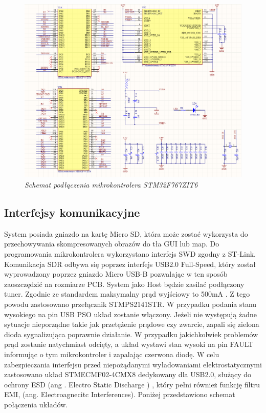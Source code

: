 \documentclass[eng,printmode]{mgr}
\begin{document}
\begin{figure}[!h]
    \centering
    \includegraphics[height=\textwidth, angle=90]{schematics/uC.png}
    \caption{\textit{Schemat podłączenia mikrokontrolera STM32F767ZIT6}}
\end{figure}

\subsection*{Interfejsy komunikacyjne}
System posiada gniazdo na kartę Micro SD, która może zostać wykorzysta do przechowywania skompresowanych obrazów do tła GUI lub map. Do programowania mikrokontrolera wykorzystano interfejs SWD zgodny z ST-Link. Komunikacja SDR odbywa się poprzez interfejs USB2.0 Full-Speed, który został wyprowadzony poprzez gniazdo Micro USB-B pozwalając w ten sposób zaoszczędzić na rozmiarze PCB. System jako Host będzie zasilać podłączony tuner. Zgodnie ze standardem maksymalny prąd wyjściowy to 500mA \cite{usbSpec}. Z tego powodu zastosowano przełącznik STMPS2141STR. W przypadku podania stanu wysokiego na pin USB PSO układ zostanie włączony. Jeżeli nie występują żadne sytuacje nieporządne takie jak przetężenie prądowe czy zwarcie, zapali się zielona dioda sygnalizująca poprawnie działanie. W przypadku jakichkolwiek problemów prąd zostanie natychmiast odcięty, a układ wystawi stan wysoki na pin FAULT informując o tym mikrokontroler i zapalając czerwona diodę. W celu zabezpieczania interfejsu przed niepożądanymi wyładowaniami elektrostatycznymi zastosowano układ STMECMF02-4CMX8 dedykowany dla USB2.0, służący do ochrony ESD (ang . Electro Static Discharge ) , który pełni również funkcję filtru EMI, (ang. Electroagnecitc Interferences). Poniżej przedstawiono schemat połączenia układów.
\end{document}
